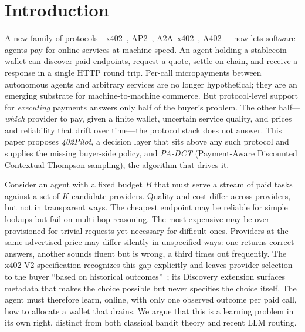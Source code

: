 \section{Introduction}
\label{sec:intro}

A new family of protocols---x402~\citep{coinbase2025x402v2}, AP2~\citep{google2025ap2}, A2A--x402~\citep{a2ax402}, A402~\citep{a402}---now lets software agents pay for online services at machine speed. An agent holding a stablecoin wallet can discover paid endpoints, request a quote, settle on-chain, and receive a response in a single HTTP round trip. Per-call micropayments between autonomous agents and arbitrary services are no longer hypothetical; they are an emerging substrate for machine-to-machine commerce. But protocol-level support for \emph{executing} payments answers only half of the buyer's problem. The other half---\emph{which} provider to pay, given a finite wallet, uncertain service quality, and prices and reliability that drift over time---the protocol stack does not answer. This paper proposes \emph{402Pilot}, a decision layer that sits above any such protocol and supplies the missing buyer-side policy, and \emph{PA-DCT} (Payment-Aware Discounted Contextual Thompson sampling), the algorithm that drives it.

Consider an agent with a fixed budget $B$ that must serve a stream of paid tasks against a set of $K$ candidate providers. Quality and cost differ across providers, but not in transparent ways. The cheapest endpoint may be reliable for simple lookups but fail on multi-hop reasoning. The most expensive may be over-provisioned for trivial requests yet necessary for difficult ones. Providers at the same advertised price may differ silently in unspecified ways: one returns correct answers, another sounds fluent but is wrong, a third times out frequently. The x402 V2 specification recognizes this gap explicitly and leaves provider selection to the buyer ``based on historical outcomes''~\citep{coinbase2025x402v2}; its Discovery extension surfaces metadata that makes the choice possible but never specifies the choice itself. The agent must therefore learn, online, with only one observed outcome per paid call, how to allocate a wallet that drains. We argue that this is a learning problem in its own right, distinct from both classical bandit theory and recent LLM routing.

